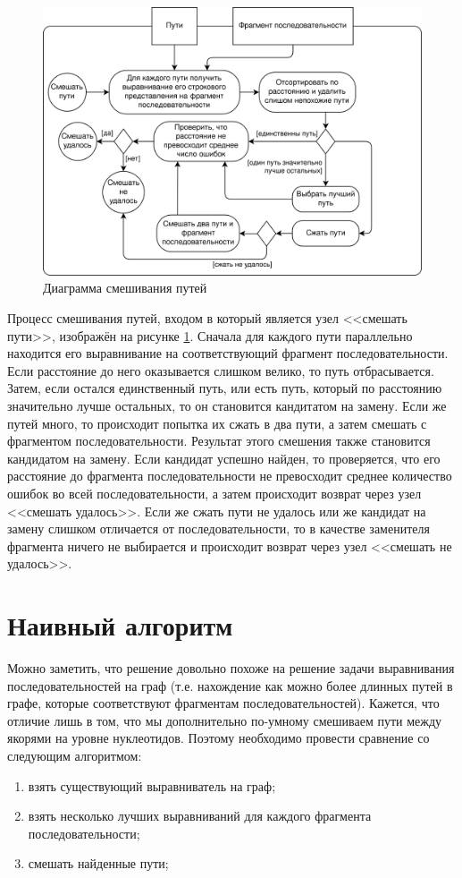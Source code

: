 \documentclass[14pt]{matmex-diploma-custom}
\begin{document}
\begin{figure}[h]
    \centering
    \includegraphics{NIR_arch-Page-3.png}
    \caption{Диаграмма смешивания путей}
    \label{fig:arch:mix}
\end{figure}

Процесс смешивания путей, входом в который является узел <<смешать пути>>, изображён на рисунке \ref{fig:arch:mix}. Сначала для каждого пути параллельно находится его выравнивание на соответствующий фрагмент последовательности. Если расстояние до него оказывается слишком велико, то путь отбрасывается. Затем, если остался единственный путь, или есть путь, который по расстоянию значительно лучше остальных, то он становится кандитатом на замену. Если же путей много, то происходит попытка их сжать в два пути, а затем смешать с фрагментом последовательности. Результат этого смешения также становится кандидатом на замену. Если кандидат успешно найден, то проверяется, что его расстояние до фрагмента последовательности не превосходит среднее количество ошибок во всей последовательности, а затем происходит возврат через узел <<смешать удалось>>. Если же сжать пути не удалось или же кандидат на замену слишком отличается от последовательности, то в качестве заменителя фрагмента ничего не выбирается и происходит возврат через узел <<смешать не удалось>>.

\section{Наивный алгоритм}
Можно заметить, что решение довольно похоже на решение задачи выравнивания последовательностей на граф (т.е. нахождение как можно более длинных путей в графе, которые соответствуют фрагментам последовательностей). Кажется, что отличие лишь в том, что мы дополнительно по-умному смешиваем пути между якорями на уровне нуклеотидов. Поэтому необходимо провести сравнение со следующим алгоритмом:
\begin{enumerate}
    \item взять существующий выравниватель на граф;
    \item взять несколько лучших выравниваний для каждого фрагмента последовательности;
    \item смешать найденные пути;
\end{enumerate}
\end{document}
